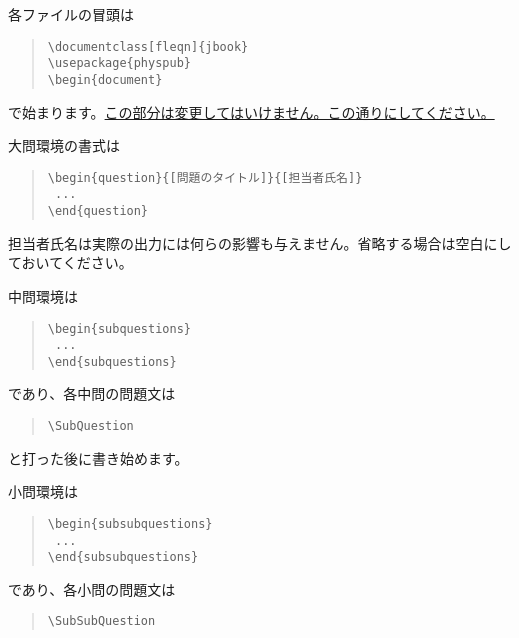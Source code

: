 \documentclass[a4j]{jarticle}
\begin{document}
各ファイルの冒頭は
\begin{quote}
\baselineskip=12pt
\begin{verbatim}
\documentclass[fleqn]{jbook}
\usepackage{physpub}
\begin{document}
\end{verbatim}
\end{quote}

で始まります。\underline{この部分は変更してはいけません。この通りにしてください。}

大問環境の書式は

\begin{quote}
\baselineskip=12pt
\begin{verbatim}
\begin{question}{[問題のタイトル]}{[担当者氏名]}
 ...
\end{question}
\end{verbatim}
\end{quote}

担当者氏名は実際の出力には何らの影響も与えません。省略する場合は空白にしておいてください。

中問環境は

\begin{quote}
\baselineskip=12pt
\begin{verbatim}
\begin{subquestions}
 ...
\end{subquestions}
\end{verbatim}
\end{quote}

であり、各中問の問題文は

\begin{quote}
\baselineskip=12pt
\begin{verbatim}
\SubQuestion
\end{verbatim}
\end{quote}

と打った後に書き始めます。

小問環境は

\begin{quote}
\baselineskip=12pt
\begin{verbatim}
\begin{subsubquestions}
 ...
\end{subsubquestions}
\end{verbatim}
\end{quote}

であり、各小問の問題文は

\begin{quote}
\baselineskip=12pt
\begin{verbatim}
\SubSubQuestion
\end{verbatim}
\end{quote}
\end{document}
